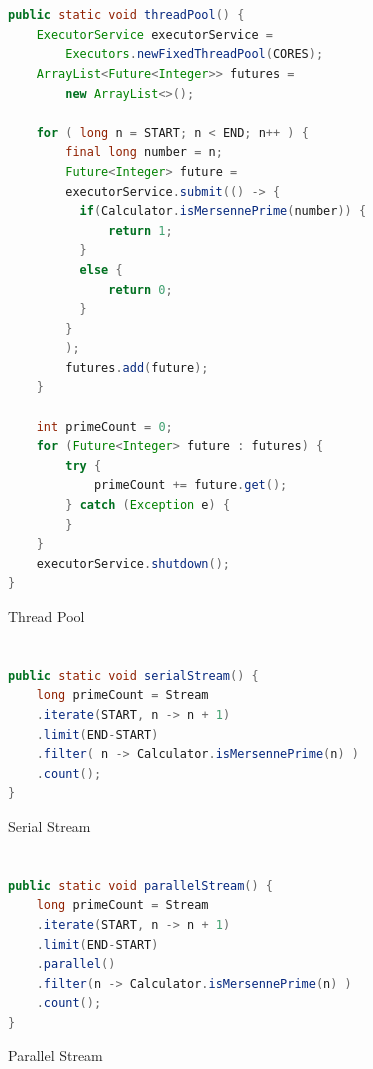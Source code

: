 \documentclass[]{report}
\begin{document}
\chapter{}
\begin{figure}[h!]
	\caption{Thread Pool}
	\begin{lstlisting}[language=Java,frame=single]
public static void threadPool() {
	ExecutorService executorService =
		Executors.newFixedThreadPool(CORES);
	ArrayList<Future<Integer>> futures =
		new ArrayList<>();
	
	for ( long n = START; n < END; n++ ) {
		final long number = n;
		Future<Integer> future =
		executorService.submit(() -> {
		  if(Calculator.isMersennePrime(number)) {
			  return 1; 
		  }
		  else {
			  return 0;
		  }
		}
		);
		futures.add(future);
	}
	
	int primeCount = 0;
	for (Future<Integer> future : futures) {
		try {
			primeCount += future.get();
		} catch (Exception e) {
		}
	}
	executorService.shutdown();
}
	\end{lstlisting}
\end{figure}

\chapter{}
\begin{figure}[h!]
	\caption{Serial Stream}
	\begin{lstlisting}[language=Java,frame=single]
public static void serialStream() {
	long primeCount = Stream
	.iterate(START, n -> n + 1)
	.limit(END-START)
	.filter( n -> Calculator.isMersennePrime(n) )
	.count();
}
	\end{lstlisting}
\end{figure}
\chapter{}
\begin{figure}[h!]
	\caption{Parallel Stream}
	\begin{lstlisting}[language=Java,frame=single]
public static void parallelStream() {
	long primeCount = Stream
	.iterate(START, n -> n + 1)
	.limit(END-START)
	.parallel()
	.filter(n -> Calculator.isMersennePrime(n) )
	.count();
}
	\end{lstlisting}
\end{figure}

\chapter{}
		
		
	
	
	
\end{document}
